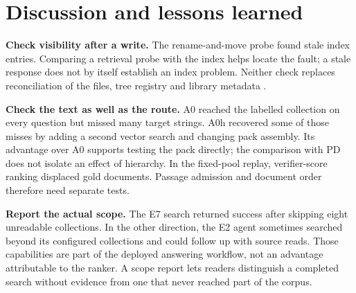 \section{Discussion and lessons learned}
\label{sec:discussion}
\textbf{Check visibility after a write.} The rename-and-move probe found
stale index entries. Comparing a retrieval probe with the index helps
locate the fault; a stale response does not by itself establish an index
problem. Neither check replaces reconciliation of the files, tree registry and
library metadata \citep{park-metadata-quality-2009,paivarinta-ecm-2005}.

\textbf{Check the text as well as the route.} A0 reached the labelled
collection on every question but missed many target strings. A0h recovered
some of those misses by adding a second vector search and changing pack assembly.
Its advantage over A0 supports testing the pack directly; the comparison
with PD does not isolate an effect of hierarchy. In the fixed-pool replay,
verifier-score ranking displaced gold documents. Passage admission and
document order therefore need separate tests.

\textbf{Report the actual scope.} The E7 search returned success after
skipping eight unreadable collections. In the other direction, the E2
agent sometimes searched beyond its configured collections and could
follow up with source reads. Those capabilities are part of the deployed
answering workflow, not an advantage attributable to the ranker. A scope
report lets readers distinguish a completed search without evidence from
one that never reached part of the corpus.
